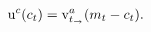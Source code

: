   \begin{equation}\begin{gathered}\begin{aligned}
        \mathrm{u}^{{c}}({c}_{t})   & = \mathrm{v}_{t_\rightarrow}^{{a}}({m}_{t}-{c}_{t}).
        \label{eq:upEqbetaOp}
      \end{aligned}\end{gathered}\end{equation}
